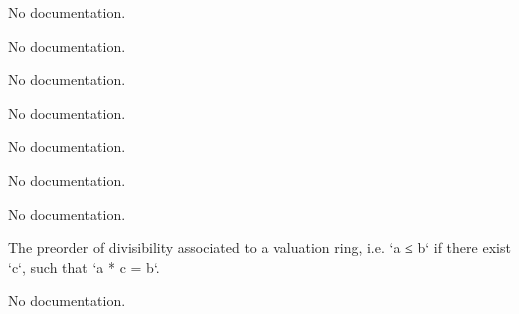 \begin{definition}\label{Valuation.ramificationIndex}
                No documentation.
    \end{definition}

\begin{definition}\label{DiscreteValuation.toInt}
                No documentation.
    \end{definition}

\begin{definition}\label{lowerIndex}
        \leanok
                No documentation.
    \end{definition}

\begin{definition}\label{RamificationGroup}
                No documentation.
    \end{definition}

\begin{theorem}\label{lower_numbering_inf}
                No documentation.
    \end{theorem}

\begin{theorem}\label{index_subgroup}
                No documentation.
    \end{theorem}

\begin{theorem}\label{index_quotient_group}
                No documentation.
    \end{theorem}

\begin{definition}\label{ValuationRingTopology.ValuationRing.setoid}
                The preorder of divisibility associated to a valuation ring, i.e. `a ≤ b` if there exist `c`, such that `a * c = b`.
    \end{definition}

\begin{definition}\label{ValuationRingTopology.ValuationRing.ValueMonoid}
                No documentation.
    \end{definition}

